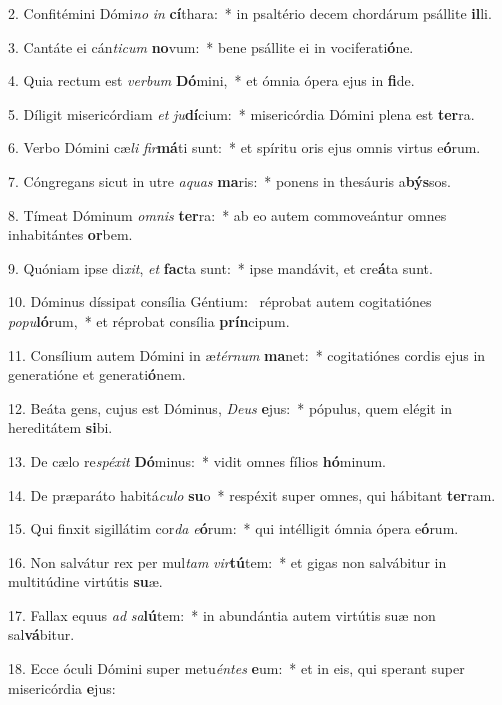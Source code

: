 2. Confitémini Dómi\textit{no} \textit{in} \textbf{cí}thara:~*  in psaltério decem chordárum psállite \textbf{il}li.\

3. Cantáte ei cán\textit{ti}\textit{cum} \textbf{no}vum:~*  bene psállite ei in vociferati\textbf{ó}ne.\

4. Quia rectum est \textit{ver}\textit{bum} \textbf{Dó}mini,~*  et ómnia ópera ejus in \textbf{fi}de.\

5. Díligit misericórdiam \textit{et} \textit{ju}\textbf{dí}cium:~*  misericórdia Dómini plena est \textbf{ter}ra.\

6. Verbo Dómini cæ\textit{li} \textit{fir}\textbf{má}ti sunt:~*  et spíritu oris ejus omnis virtus e\textbf{ó}rum.\

7. Cóngregans sicut in utre \textit{a}\textit{quas} \textbf{ma}ris:~*  ponens in thesáuris a\textbf{býs}sos.\

8. Tímeat Dóminum \textit{om}\textit{nis} \textbf{ter}ra:~*  ab eo autem commoveántur omnes inhabitántes \textbf{or}bem.\

9. Quóniam ipse di\textit{xit}, \textit{et} \textbf{fac}ta sunt:~*  ipse mandávit, et cre\textbf{á}ta sunt.\

10. Dóminus díssipat consília Géntium: \dag\  réprobat autem cogitatiónes \textit{po}\textit{pu}\textbf{ló}rum,~*  et réprobat consília \textbf{prín}cipum.\

11. Consílium autem Dómini in æ\textit{tér}\textit{num} \textbf{ma}net:~*  cogitatiónes cordis ejus in generatióne et generati\textbf{ó}nem.\

12. Beáta gens, cujus est Dóminus, \textit{De}\textit{us} \textbf{e}jus:~*  pópulus, quem elégit in hereditátem \textbf{si}bi.\

13. De cælo re\textit{spé}\textit{xit} \textbf{Dó}minus:~*  vidit omnes fílios \textbf{hó}minum.\

14. De præparáto habitá\textit{cu}\textit{lo} \textbf{su}o~*  respéxit super omnes, qui hábitant \textbf{ter}ram.\

15. Qui finxit sigillátim cor\textit{da} \textit{e}\textbf{ó}rum:~*  qui intélligit ómnia ópera e\textbf{ó}rum.\

16. Non salvátur rex per mul\textit{tam} \textit{vir}\textbf{tú}tem:~*  et gigas non salvábitur in multitúdine virtútis \textbf{su}æ.\

17. Fallax equus \textit{ad} \textit{sa}\textbf{lú}tem:~*  in abundántia autem virtútis suæ non sal\textbf{vá}bitur.\

18. Ecce óculi Dómini super metu\textit{én}\textit{tes} \textbf{e}um:~*  et in eis, qui sperant super misericórdia \textbf{e}jus:\

